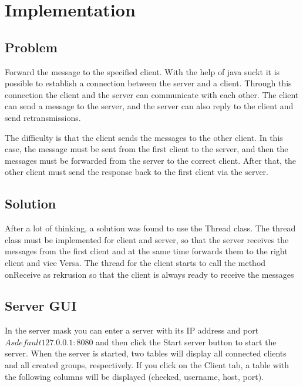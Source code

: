 \chapter{Implementation}\label{ch:implementation}


\section{Problem}\label{sec:problem}
Forward the message to the specified client.
With the help of java suckt it is possible to establish a connection between the server and
a client.
Through this connection the client and the server can communicate with each other.
The client can send a message to the server, and the server can also reply to the client and
send retransmissions.
\medskip

\noindent
The difficulty is that the client sends the messages to the other client.
In this case, the message must be sent from the first client to the server, and then the
messages must be forwarded from the server to the correct client.
After that, the other client must send the response back to the first client via the server.


\section{Solution}\label{sec:solution}
After a lot of thinking, a solution was found to use the Thread class.
The thread class must be implemented for client and server, so that the server receives the
messages from the first client and at the same time forwards them to the right client and
vice Versa.
The thread for the client starts to call the method onReceive as rekrusion so that the client
is always ready to receive the messages


\section{Server GUI}\label{sec:server-gui}
In the server mask you can enter a server with its IP address and port \(As default 127.0.0.1:8080\)
and then click the Start server button to start the server.
When the server is started, two tables will display all connected clients and all created groups,
respectively.
If you click on the Client tab, a table with the following columns will be displayed (checked,
username, host, port).
\medskip

